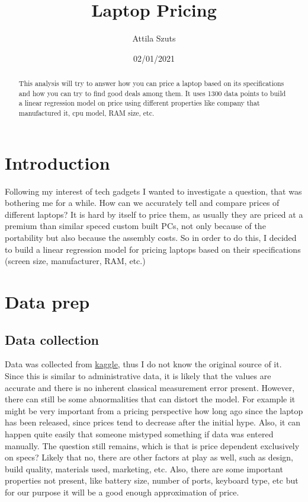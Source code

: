 \documentclass[
]{article}
\title{Laptop Pricing}
\author{Attila Szuts}
\date{02/01/2021}
\begin{document}
\maketitle
\begin{abstract}
This analysis will try to answer how you can price a laptop based on its
specifications and how you can try to find good deals among them. It
uses 1300 data points to build a linear regression model on price using
different properties like company that manufactured it, cpu model, RAM
size, etc.
\end{abstract}

{
\setcounter{tocdepth}{2}
\tableofcontents
}
\hypertarget{introduction}{%
\section{Introduction}\label{introduction}}

Following my interest of tech gadgets I wanted to investigate a
question, that was bothering me for a while. How can we accurately tell
and compare prices of different laptops? It is hard by itself to price
them, as usually they are priced at a premium than similar speced custom
built PCs, not only because of the portability but also because the
assembly costs. So in order to do this, I decided to build a linear
regression model for pricing laptops based on their specifications
(screen size, manufacturer, RAM, etc.)

\hypertarget{data-prep}{%
\section{Data prep}\label{data-prep}}

\hypertarget{data-collection}{%
\subsection{Data collection}\label{data-collection}}

Data was collected from
\href{https://www.kaggle.com/muhammetvarl/laptop-price/}{kaggle}, thus I
do not know the original source of it. Since this is similar to
administrative data, it is likely that the values are accurate and there
is no inherent classical measurement error present. However, there can
still be some abnormalities that can distort the model. For example it
might be very important from a pricing perspective how long ago since
the laptop has been released, since prices tend to decrease after the
initial hype. Also, it can happen quite easily that someone mistyped
something if data was entered manually. The question still remains,
which is that is price dependent exclusively on specs? Likely that no,
there are other factors at play as well, such as design, build quality,
materials used, marketing, etc. Also, there are some important
properties not present, like battery size, number of ports, keyboard
type, etc but for our purpose it will be a good enough approximation of
price.
\end{document}
